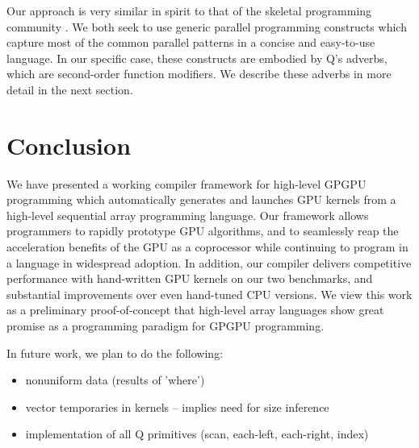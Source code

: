 \documentclass[preprint]{sigplanconf}
\begin{document}
Our approach is very similar in spirit to that of the skeletal programming
community \cite{Cole04}.  We both seek to use generic parallel programming
constructs which capture most of the common parallel patterns in a concise and
easy-to-use language.  In our specific case, these constructs are embodied by
Q's adverbs, which are second-order function modifiers.  We describe these
adverbs in more detail in the next section.

\section{Conclusion}
\label{Conclusion}

We have presented a working compiler framework for high-level GPGPU programming which automatically generates and launches GPU kernels from a high-level sequential array programming language.  Our framework allows programmers to rapidly prototype GPU algorithms, and to seamlessly reap the acceleration benefits of the GPU as a coprocessor while continuing to program in a language in widespread adoption.  In addition, our compiler delivers competitive performance with hand-written GPU kernels on our two benchmarks, and substantial improvements over even hand-tuned CPU versions.  We view this work as a preliminary proof-of-concept that high-level array languages show great promise as a programming paradigm for GPGPU programming.

In future work, we plan to do the following:

\begin{itemize}
\item nonuniform data (results of 'where')
\item vector temporaries in kernels -- implies need for size inference
\item implementation of all Q primitives (scan, each-left, each-right, index)
\end{itemize}


{}
\end{document}
